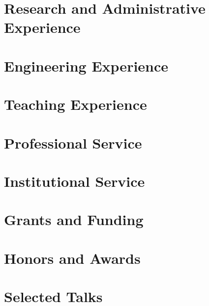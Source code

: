 \documentclass[11pt]{article}
\begin{document}


\section*{Research and Administrative Experience}

\section*{Engineering Experience}


\section*{Teaching Experience}

\section*{Professional Service}

\section*{Institutional Service}

\section*{Grants and Funding}

\section*{Honors and Awards}



\section*{Selected Talks}
\end{document}
